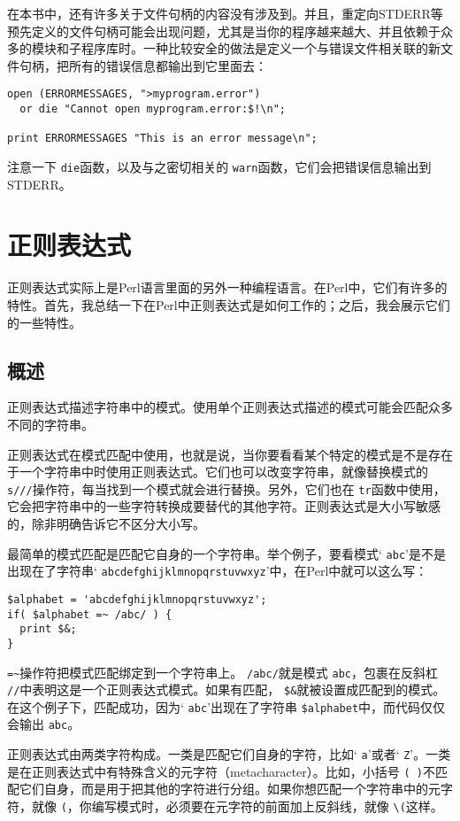 在本书中，还有许多关于文件句柄的内容没有涉及到。并且，重定向STDERR等预先定义的文件句柄可能会出现问题，尤其是当你的程序越来越大、并且依赖于众多的模块和子程序库时。一种比较安全的做法是定义一个与错误文件相关联的新文件句柄，把所有的错误信息都输出到它里面去：

\begin{lstlisting}
open (ERRORMESSAGES, ">myprogram.error") 
  or die "Cannot open myprogram.error:$!\n";

print ERRORMESSAGES "This is an error message\n";
\end{lstlisting}

注意一下 \verb|die|函数，以及与之密切相关的 \verb|warn|函数，它们会把错误信息输出到STDERR。

\section{正则表达式}
正则表达式实际上是Perl语言里面的另外一种编程语言。在Perl中，它们有许多的特性。首先，我总结一下在Perl中正则表达式是如何工作的；之后，我会展示它们的一些特性。

\subsection{概述}
正则表达式描述字符串中的模式。使用单个正则表达式描述的模式可能会匹配众多不同的字符串。

正则表达式在模式匹配中使用，也就是说，当你要看看某个特定的模式是不是存在于一个字符串中时使用正则表达式。它们也可以改变字符串，就像替换模式的 \verb|s///|操作符，每当找到一个模式就会进行替换。另外，它们也在 \verb|tr|函数中使用，它会把字符串中的一些字符转换成要替代的其他字符。正则表达式是大小写敏感的，除非明确告诉它不区分大小写。

最简单的模式匹配是匹配它自身的一个字符串。举个例子，要看模式` \verb|abc|'是不是出现在了字符串` \verb|abcdefghijklmnopqrstuvwxyz|'中，在Perl中就可以这么写：

\begin{lstlisting}
$alphabet = 'abcdefghijklmnopqrstuvwxyz';
if( $alphabet =~ /abc/ ) {
  print $&;
}
\end{lstlisting}

 \verb|=~|操作符把模式匹配绑定到一个字符串上。 \verb|/abc/|就是模式 \verb|abc|，包裹在反斜杠 \verb|//|中表明这是一个正则表达式模式。如果有匹配， \verb|$&|就被设置成匹配到的模式。在这个例子下，匹配成功，因为` \verb|abc|'出现在了字符串 \verb|$alphabet|中，而代码仅仅会输出 \verb|abc|。

正则表达式由两类字符构成。一类是匹配它们自身的字符，比如` \verb|a|'或者` \verb|Z|'。一类是在正则表达式中有特殊含义的元字符（metacharacter）。比如，小括号 \verb|( )|不匹配它们自身，而是用于把其他的字符进行分组。如果你想匹配一个字符串中的元字符，就像 \verb|(|，你编写模式时，必须要在元字符的前面加上反斜线，就像 \verb|\(|这样。

